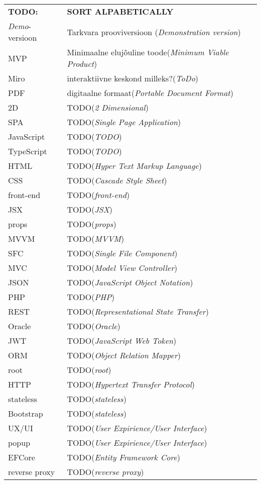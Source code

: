 \begin{longtable}{p{3cm}p{10cm}}
\textbf{TODO:}&\textbf{SORT ALPABETICALLY}\\
\textit{Demo}-versioon&Tarkvara prooviversioon (\emph{Demonstration version})\\
MVP&Minimaalne elujõuline toode(\emph{Minimum Viable Product})\\
Miro&interaktiivne keskond milleks?(\emph{ToDo})\\
PDF&digitaalne formaat(\emph{Portable Document Format})\\
2D&TODO(\emph{2 Dimensional})\\
SPA&TODO(\emph{Single Page Application})\\
JavaScript&TODO(\emph{TODO})\\
TypeScript&TODO(\emph{TODO})\\
HTML&TODO(\emph{Hyper Text Markup Language})\\
CSS&TODO(\emph{Cascade Style Sheet})\\
front-end&TODO(\emph{front-end})\\
JSX&TODO(\emph{JSX})\\
props&TODO(\emph{props})\\
MVVM&TODO(\emph{MVVM})\\
SFC&TODO(\emph{Single File Component})\\
MVC&TODO(\emph{Model View Controller})\\
JSON&TODO(\emph{JavaScript Object Notation})\\
PHP&TODO(\emph{PHP})\\
REST&TODO(\emph{Representational State Transfer})\\
Oracle&TODO(\emph{Oracle})\\
JWT&TODO(\emph{JavaScript Web Token})\\
ORM&TODO(\emph{Object Relation Mapper})\\
root&TODO(\emph{root})\\
HTTP&TODO(\emph{Hypertext Transfer Protocol})\\
stateless&TODO(\emph{stateless})\\
Bootstrap&TODO(\emph{stateless})\\
UX/UI&TODO(\emph{User Expirience/User Interface})\\
popup&TODO(\emph{User Expirience/User Interface})\\
EFCore&TODO(\emph{Entity Framework Core})\\
reverse proxy&TODO(\emph{reverse proxy})\\


\end{longtable}
\addtocounter{table}{-1} 